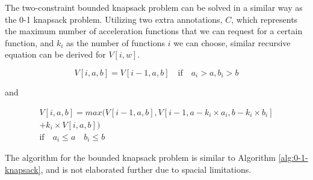 
The two-constraint bounded knapsack problem can be solved in a similar
way as the 0-1 knapsack problem. Utilizing two extra annotations, $C$, which represents the
maximum number of acceleration functions that we can request for a certain
function, and $k_i$ as the number of functions $i$ we can choose, 
 similar recursive equation can be derived for $V[i, w]$.

\begin{equation}
V[i, a, b] = V[i-1, a, b] \quad \text{if} \quad a_i > a, b_i > b
\end{equation}

and

\begin{equation}
	\begin{array}{c}
		V[i, a, b] = max(V[i-1, a, b], V[i-1, a - k_i\times a_i, b - k_i\times b_i] \\
		+ k_i\times V[i, a, b])\\
		\text{if} \quad a_i \leq a \quad b_i \leq b
	\end{array}
\end{equation}

The algorithm for the bounded knapsack problem is similar to Algorithm
\ref{alg:0-1-knapsack}, and is not elaborated further due to spacial limitations.

